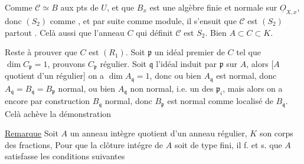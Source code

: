 Comme $\mathcal C\simeq B$ aux pts de $U$,  et que $B_x$ est une algèbre finie et normale sur $\underline O_{X,x}$, donc $(S_2)$ comme , et par suite comme module, il s'ensuit que $\mathcal C$ est $(S_2)$ partout . Celà   aussi que l'anneau $C$ qui définit $\mathcal C$ est $S_2$. Bien  $A\subset C\subset K$.

\margin{\unsure{Inutile} le fait que, $A$ étant quotient d'un régulier, on a $\dim A_{\mathfrak q}=\dim B_{\mathfrak p}$ si $\mathfrak p\in\operatorname{Spec} B$ induit $\mathfrak q$] cf verso}

Reste à prouver que $C$ est  $(R_1)$. Soit $\mathfrak p$ un idéal premier de $C$ tel que $\dim C_{\mathfrak p}=1$, prouvons $C_{\mathfrak p}$ régulier. Soit $\mathfrak q$ l'idéal induit par $\mathfrak p$ sur $A$, alors [$A$  quotient d'un régulier] on a $\dim A_{\mathfrak q}=1$, donc ou bien $A_{\mathfrak q}$ est normal, donc $A_{\mathfrak q}=B_{\mathfrak q}=B_{\mathfrak p}$  normal, ou bien $A_{\mathfrak q}$ non normal, i.e. un des $\mathfrak p_i$, mais alors on a encore par construction $B_{\mathfrak q}$ normal, donc  $B_{\mathfrak p}$ est normal comme localisé de $B_{\mathfrak q}$. Celà achève la démonstration



\uline{Remarque} Soit $A$ un anneau intègre quotient d'un anneau régulier, $K$ son corps des fractions,  Pour que la clôture intégre de $A$ soit de type fini, il f. et s. que $A$ satisfasse les conditions suivantes

